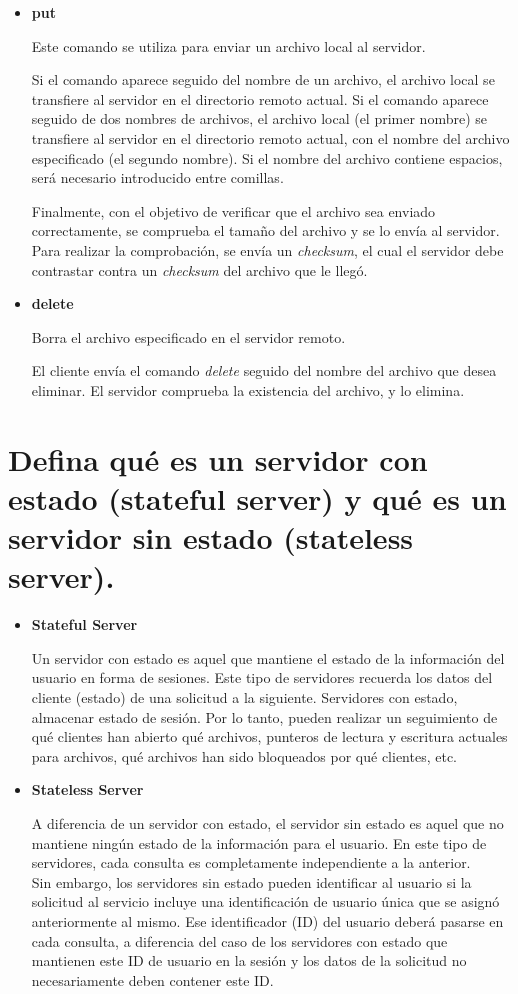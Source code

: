 \documentclass[osajnl,twocolumn,showpacs,superscriptaddress,10pt]{revtex4-1} %
\begin{document}
\begin{itemize}
    \item \textbf{put}
    
    Este comando se utiliza para enviar un archivo local al servidor.
    
    Si el comando aparece seguido del nombre de un archivo, el archivo local se transfiere al servidor en el directorio remoto actual. Si el comando aparece seguido de dos nombres de archivos, el archivo local (el primer nombre) se transfiere al servidor en el directorio remoto actual, con el nombre del archivo especificado (el segundo nombre). Si el nombre del archivo contiene espacios, será necesario introducido entre comillas.
    
    Finalmente, con el objetivo de verificar que el archivo sea enviado correctamente, se comprueba el tamaño del archivo y se lo envía al servidor. Para realizar la comprobación, se envía un \textit{checksum}, el cual el servidor debe contrastar contra un \textit{checksum} del archivo que le llegó.

    \item \textbf{delete}
    
    Borra el archivo especificado en el servidor remoto.
    
    El cliente envía el comando \textit{delete} seguido del nombre del archivo que desea eliminar. El servidor comprueba la existencia del archivo, y lo elimina.
\end{itemize}

\section{Defina qué es un servidor con estado (stateful server) y qué es un servidor sin estado (stateless server).}

\begin{itemize}
    \item \textbf{Stateful Server}
    
    Un servidor con estado es aquel que mantiene el estado de la información del usuario en forma de sesiones. Este tipo de servidores recuerda los datos del cliente (estado) de una solicitud a la siguiente. Servidores con estado, almacenar estado de sesión. Por lo tanto, pueden realizar un seguimiento de qué clientes han abierto qué archivos, punteros de lectura y escritura actuales para archivos, qué archivos han sido bloqueados por qué clientes, etc.
    
    \item \textbf{Stateless Server}
    
    A diferencia de un servidor con estado, el servidor sin estado es aquel que no mantiene ningún estado de la información para el usuario. En este tipo de servidores, cada consulta es completamente independiente a la anterior. \\
    Sin embargo, los servidores sin estado pueden identificar al usuario si la solicitud al servicio incluye una identificación de usuario única que se asignó anteriormente al mismo. Ese identificador (ID) del usuario deberá pasarse en cada consulta, a diferencia del caso de los servidores con estado que mantienen este ID de usuario en la sesión y los datos de la solicitud no necesariamente deben contener este ID.
\end{itemize}
\end{document}
